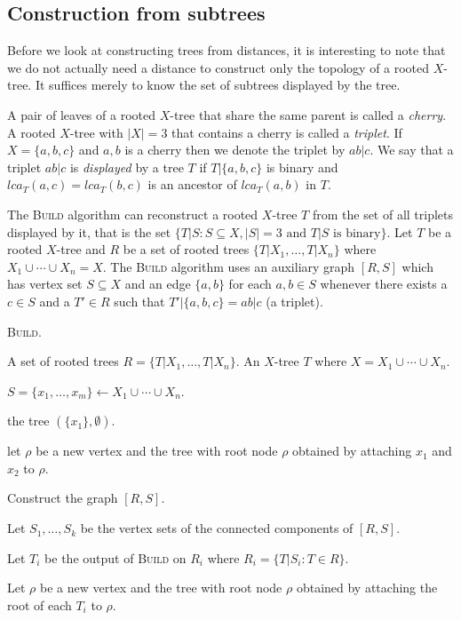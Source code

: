 \subsection{Construction from subtrees}
\label{sec:constr-from-subtr}

Before we look at constructing trees from distances, it is interesting to note
that we do not actually need a distance to construct only the topology of a
rooted $X$-tree.  It suffices merely to know the set of subtrees displayed by
the tree.  

A pair of leaves of a rooted $X$-tree that share the same parent is called a
\textit{cherry}.  A rooted $X$-tree with $|X| = 3$ that contains a cherry is
called a \textit{triplet}.  If $X = \{a,b,c\}$ and $a,b$ is a cherry then we
denote the triplet by $ab|c$.  We say that a triplet $ab|c$ is
\textit{displayed} by a tree $T$ if $T|\{a,b,c\}$ is binary and $lca_T(a,c) =
lca_T(b,c)$ is an ancestor of $lca_T(a,b)$ in $T$.

The \textsc{Build} algorithm \cite{aho1981inferring} can reconstruct a rooted
$X$-tree $T$ from the set of all triplets displayed by it, that is the set
$\{T|S \colon S \subseteq X, |S| = 3 \text{ and } T|S \text{ is binary}\}$.
Let $T$ be a rooted $X$-tree and $R$ be a set of rooted trees
$\{T|X_1,\dotsc,T|X_n\}$ where $X_1 \cup \dotsb \cup X_n = X$.  The
\textsc{Build} algorithm uses an auxiliary graph $[R,S]$ which has vertex set
$S \subseteq X$ and an edge $\{a,b\}$ for each $a,b \in S$ whenever there
exists a $c \in S$ and a $T' \in R$ such that $T'|\{a,b,c\} = ab|c$ (a
triplet).

\begin{algorithm}[h]
  \caption{\textsc{Build}.}
  \label{alg:build}

  \begin{algorithmic}
    \Require A set of rooted trees $R = \{T|X_1,\dotsc,T|X_n\}$.
    \Ensure  An $X$-tree $T$ where $X = X_1 \cup \dotsb \cup X_n$.

    \State $S = \{x_1,\dotsc,x_m\} \gets X_1 \cup \dotsb \cup X_n$.

     \Return the tree $(\{x_1\},\emptyset)$. \EndIf

     let $\rho$ be a new vertex and \Return the tree with root
    node $\rho$ obtained by attaching $x_1$ and $x_2$ to $\rho$. \EndIf

    \State Construct the graph $[R,S]$.

    \State Let $S_1,\dotsc,S_k$ be the vertex sets of the connected components
    of $[R,S]$.

    \State Let $T_i$ be the output of \textsc{Build} on $R_i$ where $R_i =
    \{T|S_i \colon T \in R\}$.
    \EndFor

    \State Let $\rho$ be a new vertex and \Return the tree with root node
    $\rho$ obtained by attaching the root of each $T_i$ to $\rho$.
    
  \end{algorithmic}
\end{algorithm}

